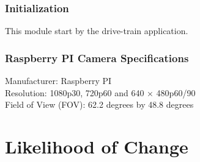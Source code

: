 \documentclass [10pt]{article}
\begin{document}

\subsubsection{Initialization}
This module start by the drive-train application.


\subsubsection{Raspberry PI Camera Specifications}
Manufacturer: Raspberry PI \\
Resolution: 1080p30, 720p60 and 640 × 480p60/90\\
Field of View (FOV): 62.2 degrees by 48.8 degrees\\



\section{Likelihood of Change}
\end{document}
